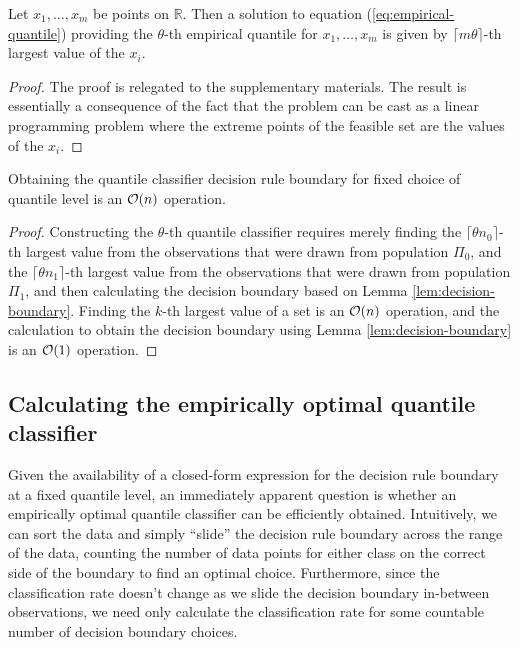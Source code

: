 \begin{lemma}
  \label{lem:empirical-quantlev}
  Let $x_1, \dots, x_m$ be points on $\mathbb{R}$.  Then a solution to equation
  (\ref{eq:empirical-quantile}) providing the $\theta$-th empirical quantile for
  $x_1, \dots, x_m$ is given by $\lceil m \theta \rceil$-th largest value of the
  $x_i$.
\end{lemma}

\begin{proof}
  The proof is relegated to the supplementary materials.  The result is
  essentially a consequence of the fact that the problem can be cast as a linear
  programming problem where the extreme points of the feasible set are the
  values of the $x_i$.
\end{proof}

\begin{lemma}
  \label{lem:decision-rule-time}
  Obtaining the quantile classifier decision rule boundary for fixed choice of
  quantile level is an $\mathcal{O}(n)$ operation.
\end{lemma}

\begin{proof}
  Constructing the $\theta$-th quantile classifier requires merely finding the
  $\lceil \theta n_0 \rceil$-th largest value from the observations that were
  drawn from population $\Pi_0$, and the $\lceil \theta n_1 \rceil$-th largest
  value from the observations that were drawn from population $\Pi_1$, and then
  calculating the decision boundary based on Lemma \ref{lem:decision-boundary}.
  Finding the $k$-th largest value of a set is an $\mathcal{O}(n)$ operation, and the
  calculation to obtain the decision boundary using Lemma
  \ref{lem:decision-boundary} is an $\mathcal{O}(1)$ operation.
\end{proof}




\subsection{Calculating the empirically optimal quantile classifier}
\label{sec:empirically-optimal-algo}

Given the availability of a closed-form expression for the decision rule
boundary at a fixed quantile level, an immediately apparent question is whether
an empirically optimal quantile classifier can be efficiently obtained.
Intuitively, we can sort the data and simply ``slide'' the decision rule
boundary across the range of the data, counting the number of data points for
either class on the correct side of the boundary to find an optimal choice.
Furthermore, since the classification rate doesn't change as we slide the
decision boundary in-between observations, we need only calculate the
classification rate for some countable number of decision boundary choices.

